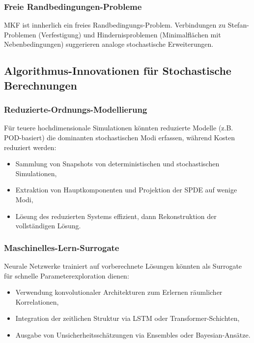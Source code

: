 \documentclass[a4paper,12pt]{article}
\theoremstyle{definition}
\begin{document}
\subsubsection{Freie Randbedingungen-Probleme}

MKF ist innherlich ein freies Randbedingungs-Problem. Verbindungen zu Stefan-Problemen (Verfestigung) und Hindernisproblemen (Minimalflächen mit Nebenbedingungen) suggerieren analoge stochastische Erweiterungen.

\subsection{Algorithmus-Innovationen für Stochastische Berechnungen}

\subsubsection{Reduzierte-Ordnungs-Modellierung}

Für teuere hochdimensionale Simulationen könnten reduzierte Modelle (z.B. POD-basiert) die dominanten stochastischen Modi erfassen, während Kosten reduziert werden:

\begin{itemize}
	\item Sammlung von Snapshots von deterministischen und stochastischen Simulationen,
	\item Extraktion von Hauptkomponenten und Projektion der SPDE auf wenige Modi,
	\item Lösung des reduzierten Systems effizient, dann Rekonstruktion der vollständigen Lösung.
\end{itemize}

\subsubsection{Maschinelles-Lern-Surrogate}

Neurale Netzwerke trainiert auf vorberechnete Lösungen könnten als Surrogate für schnelle Parameterexploration dienen:

\begin{itemize}
	\item Verwendung konvolutionaler Architekturen zum Erlernen räumlicher Korrelationen,
	\item Integration der zeitlichen Struktur via LSTM oder Transformer-Schichten,
	\item Ausgabe von Unsicherheitsschätzungen via Ensembles oder Bayesian-Ansätze.
\end{itemize}
\end{document}
